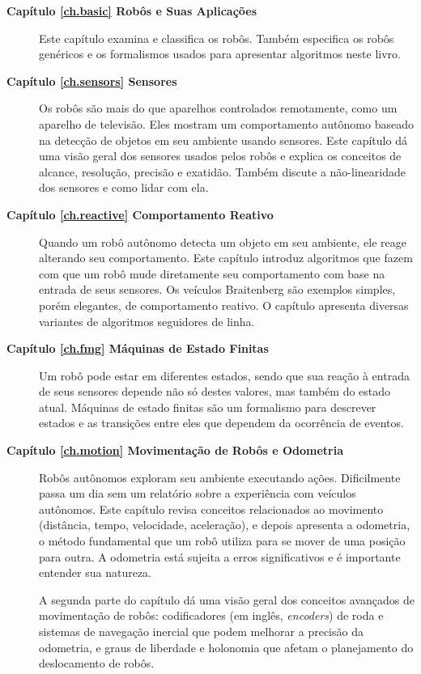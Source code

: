 \begin{description}
\item [\textbf{Capítulo \ref{ch.basic} Robôs e Suas Aplicações}] Este capítulo examina e classifica os robôs. Também especifica os robôs genéricos e os formalismos usados para apresentar algoritmos neste livro.

\item [\textbf{Capítulo \ref{ch.sensors} Sensores}] Os robôs são mais do que aparelhos controlados remotamente, como um aparelho de televisão. Eles mostram um comportamento autônomo baseado na detecção de objetos em seu ambiente usando sensores. Este capítulo dá uma visão geral dos sensores usados pelos robôs e explica os conceitos de alcance, resolução, precisão e exatidão. Também discute a não-linearidade dos sensores e como lidar com ela.

\item [\textbf{Capítulo \ref{ch.reactive} Comportamento Reativo}] Quando um robô autônomo detecta um objeto em seu ambiente, ele reage alterando seu comportamento. Este capítulo introduz algoritmos que fazem com que um robô mude diretamente seu comportamento com base na entrada de seus sensores. Os veículos Braitenberg são exemplos simples, porém elegantes, de comportamento reativo. O capítulo apresenta diversas variantes de algoritmos seguidores de linha.

\item [\textbf{Capítulo \ref{ch.fmg} Máquinas de Estado Finitas}] Um robô pode estar em diferentes estados, sendo que sua reação à entrada de seus sensores depende não só destes valores, mas também do estado atual. Máquinas de estado finitas são um formalismo para descrever estados e as transições entre eles que dependem da ocorrência de eventos.

\item [\textbf{Capítulo \ref{ch.motion} Movimentação de Robôs e Odometria}] Robôs autônomos exploram seu ambiente executando ações. Dificilmente passa um dia sem um relatório sobre a experiência com veículos autônomos. Este capítulo revisa conceitos relacionados ao movimento (distância, tempo, velocidade, aceleração), e depois apresenta a odometria, o método fundamental que um robô utiliza para se mover de uma posição para outra. A odometria está sujeita a erros significativos e é importante entender sua natureza.

A segunda parte do capítulo dá uma visão geral dos conceitos avançados de movimentação de robôs: codificadores (em inglês, \emph{encoders}) de roda e sistemas de navegação inercial que podem melhorar a precisão da odometria, e graus de liberdade e holonomia que afetam o planejamento do deslocamento de robôs.


\end{description}
